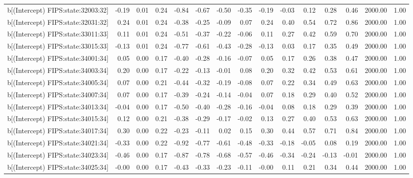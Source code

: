 \begin{table}[ht]
\begin{tabular}{rrrrrrrrrrrrrrr}
  b[(Intercept) FIPS:state:32003:32] & -0.19 & 0.01 & 0.24 & -0.84 & -0.67 & -0.50 & -0.35 & -0.19 & -0.03 & 0.12 & 0.28 & 0.46 & 2000.00 & 1.00 \\ 
  b[(Intercept) FIPS:state:32031:32] & 0.24 & 0.01 & 0.24 & -0.38 & -0.25 & -0.09 & 0.07 & 0.24 & 0.40 & 0.54 & 0.72 & 0.86 & 2000.00 & 1.00 \\ 
  b[(Intercept) FIPS:state:33011:33] & 0.11 & 0.01 & 0.24 & -0.51 & -0.37 & -0.22 & -0.06 & 0.11 & 0.27 & 0.42 & 0.59 & 0.70 & 2000.00 & 1.00 \\ 
  b[(Intercept) FIPS:state:33015:33] & -0.13 & 0.01 & 0.24 & -0.77 & -0.61 & -0.43 & -0.28 & -0.13 & 0.03 & 0.17 & 0.35 & 0.49 & 2000.00 & 1.00 \\ 
  b[(Intercept) FIPS:state:34001:34] & 0.05 & 0.00 & 0.17 & -0.40 & -0.28 & -0.16 & -0.07 & 0.05 & 0.17 & 0.26 & 0.38 & 0.47 & 2000.00 & 1.00 \\ 
  b[(Intercept) FIPS:state:34003:34] & 0.20 & 0.00 & 0.17 & -0.22 & -0.13 & -0.01 & 0.08 & 0.20 & 0.32 & 0.42 & 0.53 & 0.61 & 2000.00 & 1.00 \\ 
  b[(Intercept) FIPS:state:34005:34] & 0.07 & 0.00 & 0.21 & -0.44 & -0.32 & -0.19 & -0.08 & 0.07 & 0.22 & 0.34 & 0.49 & 0.63 & 2000.00 & 1.00 \\ 
  b[(Intercept) FIPS:state:34007:34] & 0.07 & 0.00 & 0.17 & -0.39 & -0.24 & -0.14 & -0.04 & 0.07 & 0.18 & 0.29 & 0.40 & 0.52 & 2000.00 & 1.00 \\ 
  b[(Intercept) FIPS:state:34013:34] & -0.04 & 0.00 & 0.17 & -0.50 & -0.40 & -0.28 & -0.16 & -0.04 & 0.08 & 0.18 & 0.29 & 0.39 & 2000.00 & 1.00 \\ 
  b[(Intercept) FIPS:state:34015:34] & 0.12 & 0.00 & 0.21 & -0.38 & -0.29 & -0.17 & -0.02 & 0.13 & 0.27 & 0.40 & 0.53 & 0.63 & 2000.00 & 1.00 \\ 
  b[(Intercept) FIPS:state:34017:34] & 0.30 & 0.00 & 0.22 & -0.23 & -0.11 & 0.02 & 0.15 & 0.30 & 0.44 & 0.57 & 0.71 & 0.84 & 2000.00 & 1.00 \\ 
  b[(Intercept) FIPS:state:34021:34] & -0.33 & 0.00 & 0.22 & -0.92 & -0.77 & -0.61 & -0.48 & -0.33 & -0.18 & -0.05 & 0.08 & 0.19 & 2000.00 & 1.00 \\ 
  b[(Intercept) FIPS:state:34023:34] & -0.46 & 0.00 & 0.17 & -0.87 & -0.78 & -0.68 & -0.57 & -0.46 & -0.34 & -0.24 & -0.13 & -0.01 & 2000.00 & 1.00 \\ 
  b[(Intercept) FIPS:state:34025:34] & -0.00 & 0.00 & 0.17 & -0.43 & -0.33 & -0.23 & -0.11 & -0.00 & 0.11 & 0.21 & 0.34 & 0.44 & 2000.00 & 1.00 \\ 

\end{tabular}
\end{table}
